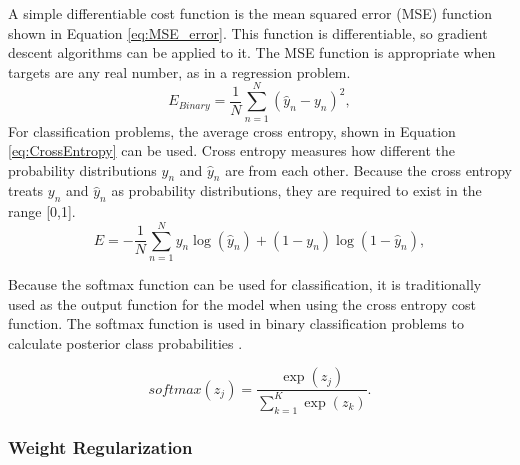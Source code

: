 A simple differentiable cost function is the mean squared error (MSE) function shown in Equation \ref{eq:MSE_error}. This function is differentiable, so gradient descent algorithms can be applied to it. The MSE function is appropriate when targets are any real number, as in a regression problem. 
%
\begin{equation} \label{eq:MSE_error}
E_{Binary} = {\frac{1} N} \sum_{n=1}^N (\hat{y}_n - y_n)^2,
\end{equation}
%
For classification problems, the average cross entropy, shown in Equation \ref{eq:CrossEntropy} can be used. Cross entropy measures how different the probability distributions $y_n$ and $\hat{y}_n$ are from each other. Because the cross entropy treats $y_n$ and $\hat{y}_n$ as probability distributions, they are required to exist in the range [0,1].
%
\begin{equation} \label{eq:CrossEntropy}
E = -{\frac{1} N} \sum_{n=1}^N y_n \log(\hat{y}_n) +  (1-y_n) \log(1-\hat{y}_n), 
\end{equation}
%

Because the softmax function can be used for classification, it is traditionally used as the output function for the model when using the cross entropy cost function. The softmax function is used in binary classification problems to calculate posterior class probabilities \cite{Bridle1990}.

\begin{equation} \label{eq:softmax}
softmax(z_j) = \frac{\exp(z_j)} {\sum_{k=1}^{K} \exp(z_k)}.
\end{equation}



\subsubsection{Weight Regularization}

